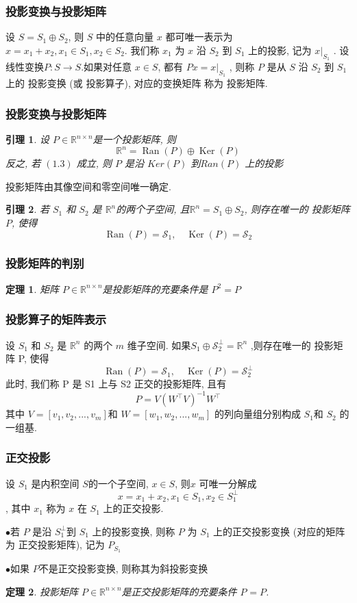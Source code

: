 \documentclass[notheorems,serif]{beamer}
\newcommand{\hei}[1]{{\HEI#1}}
\newtheorem{theorem}{\hei{定理}}
\newtheorem{lemma}{\hei{引理}}
\begin{document}
\begin{frame}
\frametitle{投影变换与投影矩阵}
设 $S = S_1 \oplus S_2$, 则 $S$ 中的任意向量 $x$ 都可唯一表示为
$x = x_1 + x_2, x_1 ∈ S_1, x_2 ∈ S_2.$
我们称 $x_1$ 为 $x$ 沿 $S_2$ 到 $S_1$ 上的投影, 记为 $x|_{S_1}$
.
设线性变换$ P : S → S. $如果对任意 $x ∈ S$, 都有
$P x = x|_{S_1}$
,
则称 $P$ 是从 $S$ 沿 $S_2$ 到 $S_1$ 上的 投影变换 (或 投影算子), 对应的变换矩阵
称为 投影矩阵.
\end{frame}

\begin{frame}
\frametitle{投影变换与投影矩阵}
\begin{lemma}
	设 $P ∈ \mathbb{R}^{n×n} $是一个投影矩阵, 则
	\begin{equation}
	\mathbb{R}^{n}=\operatorname{Ran}(P) \oplus \operatorname{Ker}(P)
	\end{equation}
	反之, 若 $(1.3)$ 成立, 则 $P$ 是沿 $Ker(P)$ 到$ Ran(P)$ 上的投影
\end{lemma}

投影矩阵由其像空间和零空间唯一确定.


\begin{lemma}
	若 $S_1$ 和 $S_2$ 是 $\mathbb{R}^n$的两个子空间, 且$ \mathbb{R}^n= S_1 ⊕ S_2$, 则存在唯一的
	投影矩阵 $P$, 使得
	$$
	\operatorname{Ran}(P)=\mathcal{S}_{1}, \quad \operatorname{Ker}(P)=\mathcal{S}_{2}
	$$
\end{lemma}
\end{frame}

\begin{frame}
\frametitle{投影矩阵的判别}
\begin{theorem}
	矩阵 $P ∈\mathbb{R}^{n×n}$是投影矩阵的充要条件是 $P^2=P$
\end{theorem}

\end{frame}

\begin{frame}
\frametitle{投影算子的矩阵表示}
设 $S_1$ 和 $S_2$ 是 $\mathbb{R}^n$ 的两个 $m$ 维子空间. 如果$S_{1} \oplus \mathcal{S}_{2}^{\perp}=\mathbb{R}^{n}$ ,则存在唯一的
投影矩阵 P, 使得
$$
\operatorname{Ran}(P)=\mathcal{S}_{1}, \quad \operatorname{Ker}(P)=\mathcal{S}_{2}^{\perp}
$$
此时, 我们称 P 是 S1 上与 S2 正交的投影矩阵, 且有
$$
P=V\left(W^{\top} V\right)^{-1} W^{\top}
$$
其中 $V = [v_1, v_2, . . . , v_m] $和 $W = [w_1, w_2, . . . , w_m]$ 的列向量组分别构成
$S_1 $和 $S_2$ 的一组基.
\end{frame}

\begin{frame}
\frametitle{正交投影}
设 $S_1$ 是内积空间 $S $的一个子空间, $x ∈ S$, 则$x$ 可唯一分解成
$$x = x_1 + x_2, x_1 ∈ S_1, x_2 ∈ S^{⊥}_1$$
,
其中 $x_1$ 称为 $x$ 在 $S_1$ 上的正交投影.

\qquad$\bullet$若 $P$ 是沿 $S^{⊥}_1 $到 $S_1$ 上的投影变换, 则称 $P$ 为 $S_1$ 上的正交投影变换
(对应的矩阵为 正交投影矩阵), 记为 $P_{S_1}$

\qquad$\bullet$如果 $P $不是正交投影变换, 则称其为斜投影变换

\begin{theorem}
	投影矩阵 $P ∈\mathbb{R}^{n×n}$是正交投影矩阵的充要条件 $P^{} = P$.
\end{theorem}
\end{frame}
\end{document}
